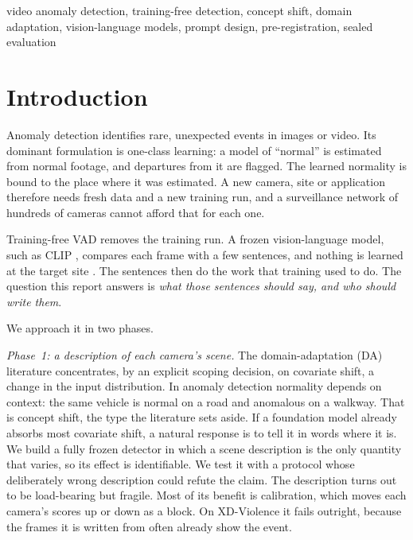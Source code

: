 \documentclass[conference,a4paper]{IEEEtran}
\begin{document}
\begin{IEEEkeywords}
video anomaly detection, training-free detection, concept shift, domain
adaptation, vision-language models, prompt design, pre-registration, sealed
evaluation
\end{IEEEkeywords}

\section{Introduction}
\label{sec:intro}

Anomaly detection identifies rare, unexpected events in images or video. Its
dominant formulation is one-class learning: a model of ``normal'' is estimated
from normal footage, and departures from it are flagged. The learned normality
is bound to the place where it was estimated. A new camera, site or application
therefore needs fresh data and a new training run, and a surveillance network
of hundreds of cameras cannot afford that for each one.

Training-free VAD removes the training run. A frozen vision-language model,
such as CLIP \cite{radford2021clip}, compares each frame with a few sentences,
and nothing is learned at the target site
\cite{zanella2024lavad, anyanomaly2025, yin2026nova, lee2025flashback,
zou2026askhint}. The sentences then do the work that training used to do. The
question this report answers is \emph{what those sentences should say, and who
should write them}.

We approach it in two phases.

\emph{Phase~1: a description of each camera's scene.} The domain-adaptation (DA)
literature concentrates, by an explicit scoping decision, on covariate shift, a
change in the input distribution. In anomaly detection normality depends on
context: the same vehicle is normal on a road and anomalous on a walkway. That is
concept shift, the type the literature sets aside. If a foundation model already
absorbs most covariate shift, a natural response is to tell it in words where it
is. We build a fully frozen detector in which a scene description is the only
quantity that varies, so its effect is identifiable. We test it with a protocol
whose deliberately wrong description could refute the claim. The description
turns out to be load-bearing but fragile. Most of its benefit is calibration,
which moves each camera's scores up or down as a block. On XD-Violence it fails
outright, because the frames it is written from often already show the event.
\end{document}
